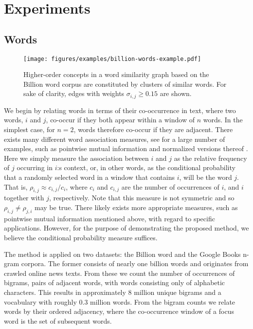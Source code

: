 \documentclass{sig-alternate}
\newcommand{\rn}[1]{\rho_{#1}}
\newcommand{\sy}[1]{\sigma_{#1}}
\begin{document}
\section{Experiments}

\subsection{Words}
\label{subsec:words}

\begin{figure*}
\begin{center}
\texttt{[image: figures/examples/billion-words-example.pdf]}
\end{center}
\caption{Higher-order concepts in a word similarity graph based on the Billion word corpus are constituted by clusters of similar words. For sake of clarity, edges with weights $\sy{i,j} \geq 0.15$ are shown.}
\label{fig:billion-words-example}
\end{figure*}

We begin by relating words in terms of their co-occurrence in text, where two words, $i$ and $j$, co-occur if they both
appear within a window of $n$ words. In the simplest case, for $n = 2$, words therefore co-occur if they are adjacent.
There exists many different word association measures, see \cite{Pecina08} for a large number of examples, such as
pointwise mutual information \cite{Church90} and normalized versions thereof \cite{Bouma09}. Here we simply measure the
association between $i$ and $j$ as the relative frequency of $j$ occurring in $i$:s context, or, in other words, as the
conditional probability that a randomly selected word in a window that contains $i$, will be the word $j$. That is, $\rn{i,j}
\approx c_{i,j}/{c_i}$, where $c_i$ and $c_{i,j}$ are the number of occurrences of $i$, and $i$ together with $j$,
respectively. Note that this measure is not symmetric and so $\rn{i,j} \neq \rn{j,i}$ may be true. There likely exists more
appropriate measures, such as pointwise mutual information mentioned above, with regard to specific applications.
However, for the purpose of demonstrating the proposed method, we believe the conditional probability measure suffices.

The method is applied on two datasets: the Billion word \cite{Chelba13} and
the Google Books n-gram \cite{Michel10,Lin12} corpora. The former consists of
nearly one billion words and originates from crawled online news texts. From
these we count the number of occurrences of bigrams, pairs of adjacent words, with words consisting only
of alphabetic characters. This results in approximately 8 million unique
bigrams and a vocabulary with roughly 0.3 million words. From the bigram counts
we relate words by their ordered adjacency, where the co-occurrence window of a focus word
is the set of subsequent words.
\end{document}

